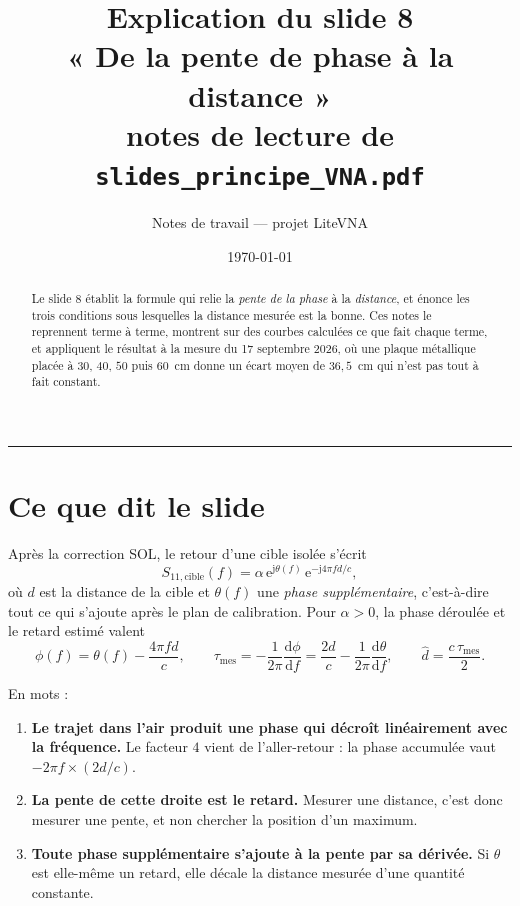 \documentclass[11pt,a4paper]{article}
\title{\bfseries Explication du slide 8\\[1mm]
       \large « De la pente de phase à la distance »\\[2mm]
       \normalsize notes de lecture de \texttt{slides\_principe\_VNA.pdf}}
\author{Notes de travail --- projet LiteVNA}
\date{\today}
\newcommand{\ee}{\mathrm{e}}
\newcommand{\jj}{\mathrm{j}}
\begin{document}
\maketitle

\begin{abstract}
\noindent
Le slide 8 établit la formule qui relie la \emph{pente de la phase} à la
\emph{distance}, et énonce les trois conditions sous lesquelles la distance
mesurée est la bonne. Ces notes le reprennent terme à terme, montrent sur des
courbes calculées ce que fait chaque terme, et appliquent le résultat à la
mesure du 17 septembre 2026, où une plaque métallique placée à $30$, $40$, $50$
puis $60$~cm donne un écart moyen de $36{,}5$~cm qui n'est pas tout à fait
constant.
\end{abstract}

\tableofcontents
\bigskip\hrule\bigskip

\section{Ce que dit le slide}

Après la correction SOL, le retour d'une cible isolée s'écrit
\[
  S_{11,\text{cible}}(f) = \alpha\,\ee^{\jj\theta(f)}\,
  \ee^{-\jj 4\pi f d / c},
\]
où $d$ est la distance de la cible et $\theta(f)$ une \emph{phase
supplémentaire}, c'est-à-dire tout ce qui s'ajoute après le plan de
calibration. Pour $\alpha > 0$, la phase déroulée et le retard estimé valent
\[
  \phi(f) = \theta(f) - \frac{4\pi f d}{c},
  \qquad
  \tau_{\text{mes}} = -\frac{1}{2\pi}\frac{\mathrm{d}\phi}{\mathrm{d}f}
  = \frac{2d}{c} - \frac{1}{2\pi}\frac{\mathrm{d}\theta}{\mathrm{d}f},
  \qquad
  \hat d = \frac{c\,\tau_{\text{mes}}}{2}.
\]

En mots :

\begin{enumerate}[label=\textbf{\arabic*.}]
\item \textbf{Le trajet dans l'air produit une phase qui décroît linéairement
      avec la fréquence.} Le facteur $4$ vient de l'aller-retour : la phase
      accumulée vaut $-2\pi f \times (2d/c)$.
\item \textbf{La pente de cette droite est le retard.} Mesurer une distance,
      c'est donc mesurer une pente, et non chercher la position d'un maximum.
\item \textbf{Toute phase supplémentaire s'ajoute à la pente par sa dérivée.}
      Si $\theta$ est elle-même un retard, elle décale la distance mesurée
      d'une quantité constante.
\end{enumerate}
\end{document}
